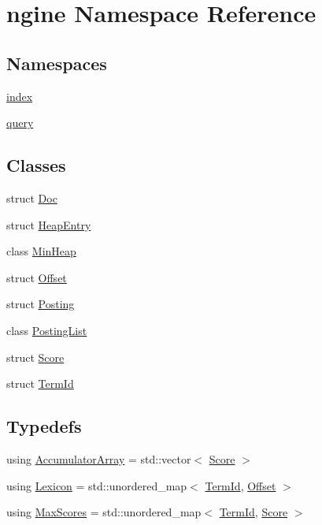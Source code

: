 \hypertarget{namespacengine}{}\section{ngine Namespace Reference}
\label{namespacengine}
\subsection*{Namespaces}
\begin{DoxyCompactItemize}
\item 
 \hyperlink{namespacengine_1_1index}{index}
\item 
 \hyperlink{namespacengine_1_1query}{query}
\end{DoxyCompactItemize}
\subsection*{Classes}
\begin{DoxyCompactItemize}
\item 
struct \hyperlink{structngine_1_1Doc}{Doc}
\item 
struct \hyperlink{structngine_1_1HeapEntry}{Heap\+Entry}
\item 
class \hyperlink{classngine_1_1MinHeap}{Min\+Heap}
\item 
struct \hyperlink{structngine_1_1Offset}{Offset}
\item 
struct \hyperlink{structngine_1_1Posting}{Posting}
\item 
class \hyperlink{classngine_1_1PostingList}{Posting\+List}
\item 
struct \hyperlink{structngine_1_1Score}{Score}
\item 
struct \hyperlink{structngine_1_1TermId}{Term\+Id}
\end{DoxyCompactItemize}
\subsection*{Typedefs}
\begin{DoxyCompactItemize}
\item 
using \hyperlink{namespacengine_a1da6a55100934f314367b885143c56aa}{Accumulator\+Array} = std\+::vector$<$ \hyperlink{structngine_1_1Score}{Score} $>$
\item 
using \hyperlink{namespacengine_a97aa1030dca95ffefec4e7487a155015}{Lexicon} = std\+::unordered\+\_\+map$<$ \hyperlink{structngine_1_1TermId}{Term\+Id}, \hyperlink{structngine_1_1Offset}{Offset} $>$
\item 
using \hyperlink{namespacengine_a92bfb5e91078f4b4dffe6f960f0f2016}{Max\+Scores} = std\+::unordered\+\_\+map$<$ \hyperlink{structngine_1_1TermId}{Term\+Id}, \hyperlink{structngine_1_1Score}{Score} $>$
\end{DoxyCompactItemize}


